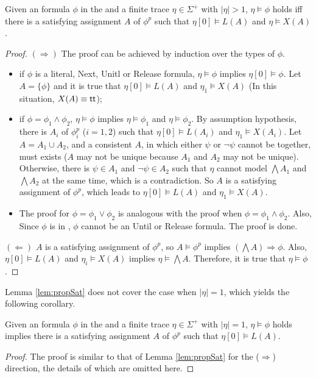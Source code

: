 \begin{lemma}\label{lem:propSat}
Given an \ltlf formula $\phi$ in the \XNF and a finite trace $\eta\in\Sigma^+$ with $|\eta|>1$, $\eta\models\phi$ holds iff there is a satisfying assignment $A$ of $\phi^p$ such that $\eta[0]\models L(A)$ and $\eta\models X(A)$.
\end{lemma}
\begin{proof}
$(\Rightarrow)$ The proof can be achieved by induction over the types of $\phi$.
\begin{itemize}
	\item if $\phi$ is a literal, Next, Unitl or Release formula, $\eta\models\phi$ implies $\eta[0]\models\phi$. Let $A=\{\phi\}$ and it is true that $\eta[0]\models L(A)$ and $\eta_1\models X(A)$ (In this situation, $X(A)\equiv \tt$); 
	\item if $\phi = \phi_1\wedge\phi_2$, $\eta\models\phi$ 
implies $\eta\models\phi_1$ and $\eta\models\phi_2$. By assumption hypothesis, there is $A_i$ of $\phi_i^p$ ($i=1,2$) such that 
$\eta[0]\models L(A_i)$ and $\eta_1\models X(A_i)$. Let $A = A_1\cup A_2$, and a consistent $A$, in which either $\psi$ or $\neg \psi$ cannot be together, 
must exists ($A$ may not be unique because $A_1$ and $A_2$ may not be unique). 
Otherwise, there is $\psi\in A_1$ and $\neg\psi\in A_2$ 
such that $\eta$ cannot model $\bigwedge A_1$ and $\bigwedge A_2$ at the same time, which is a contradiction. So $A$ is a satisfying  assignment of $\phi^p$, which leads to $\eta[0]\models L(A)$ and $\eta_1\models X(A)$. 
\item The proof for $\phi=\phi_1\vee\phi_2$ is analogous with the proof when $\phi = \phi_1\wedge\phi_2$. Also, Since $\phi$ is in \XNF, $\phi$ cannot be an Until or Release formula. The proof is done.
\end{itemize} 

$(\Leftarrow)$ $A$ is a satisfying assignment of $\phi^p$, so $A\models\phi^p$ implies $(\bigwedge A)\Rightarrow \phi$. 
Also, $\eta[0]\models L(A)$ and $\eta_i\models X(A)$ implies $\eta\models \bigwedge A$. Therefore, it is true that $\eta\models \phi$.
\end{proof}

Lemma \ref{lem:propSat} does not cover the case when $|\eta|=1$, which yields the following corollary. 

\begin{corollary}\label{coro:propSat}
Given an \ltlf formula $\phi$ in the \XNF and a finite trace $\eta\in\Sigma^+$ with $|\eta|=1$, $\eta\models\phi$ holds implies there is a satisfying assignment $A$ of $\phi^p$ such that $\eta[0]\models L(A)$.
\end{corollary}
\begin{proof}
The proof is similar to that of Lemma \ref{lem:propSat} for the ($\Rightarrow$) direction, the details of which are omitted here.
\end{proof}
  
